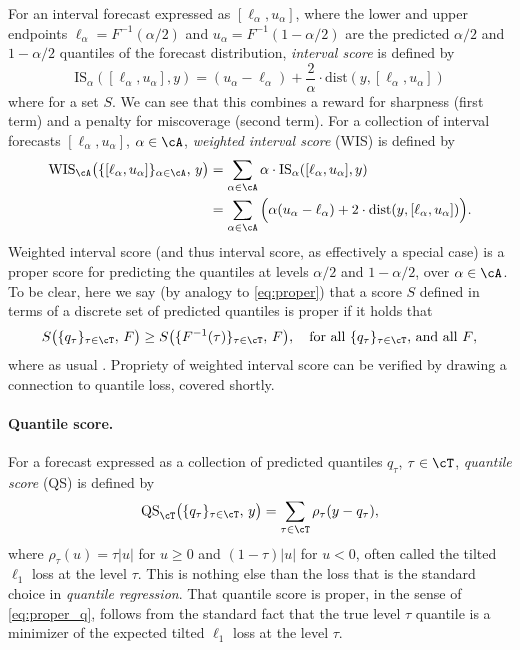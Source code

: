 \documentclass{article}
\begin{document}
For an interval forecast expressed as $[\ell_\alpha, u_\alpha]$, where the lower
and upper endpoints $\ell_\alpha = F^{-1}(\alpha/2)$ and $u_\alpha =
F^{-1}(1-\alpha/2)$ are the predicted $\alpha/2$ and $1-\alpha/2$ quantiles of
the forecast distribution, \emph{interval score} is defined by 
\[
\mathrm{IS}_\alpha( [\ell_\alpha, u_\alpha], y) = 
(u_\alpha - \ell_\alpha) + \frac{2}{\alpha} \cdot
\mathrm{dist}(y, [\ell_\alpha, u_\alpha])
\]
where  for a set $S$. We can
see that this combines a reward for sharpness (first term) and a penalty for 
miscoverage (second term). For a collection of interval forecasts
$[\ell_\alpha, u_\alpha]$, $\alpha \in \cA$, \emph{weighted interval score}
(WIS) is defined by
\begin{align}
\nonumber
\mathrm{WIS}_\cA \big( \{[\ell_\alpha, u_\alpha]\}_{\alpha \in \cA}, \, y \big)  
&= \sum_{\alpha \in \cA} \alpha \cdot \mathrm{IS}_\alpha( [\ell_\alpha,
  u_\alpha], y) \\
\label{eq:wis}
&=\sum_{\alpha \in \cA} \Big(\alpha (u_\alpha - \ell_\alpha) + 2 \cdot
  \mathrm{dist}(y, [\ell_\alpha, u_\alpha]) \Big).
\end{align}
Weighted interval score (and thus interval score, as effectively a special case)
is a proper score for predicting the quantiles at levels $\alpha/2$ and
$1-\alpha/2$, over $\alpha \in \cA$. To be clear, here we say (by analogy to 
\eqref{eq:proper}) that a score $S$ defined in terms of a discrete set of
predicted quantiles  is proper if it holds that   
\begin{equation}
\label{eq:proper_q}
S \big( \{q_\tau\}_{\tau \in \cT}, \, F \big) \geq S \big(
\{F^{-1}(\tau)\}_{\tau \in \cT}, \, F \big), \quad \text{for all
$\{q_\tau\}_{\tau \in \cT}$, and all $F$},    
\end{equation}
where as usual . Propriety of weighted interval score  
can be verified by drawing a connection to quantile loss, covered shortly.  

\paragraph{Quantile score.}

For a forecast expressed as a collection of predicted quantiles $q_\tau$, $\tau
\in \cT$, \emph{quantile score} (QS) is defined by 
\begin{equation}
\label{eq:qs}
\mathrm{QS}_\cT \big( \{q_\tau\}_{\tau \in \cT}, \, y \big) = 
\sum_{\tau \in \cT} \rho_\tau(y - q_\tau),
\end{equation}
where $\rho_\tau(u) = \tau |u|$ for $u \geq 0$ and $(1-\tau) |u|$ for $u < 0$,
often called the tilted $\ell_1$ loss at the level $\tau$. This is nothing else
than the loss that is the standard choice in \emph{quantile regression}. That
quantile score is proper, in the sense of \eqref{eq:proper_q}, follows from the
standard fact that the true level $\tau$ quantile is a minimizer of the expected
tilted $\ell_1$ loss at the level $\tau$.
\end{document}
